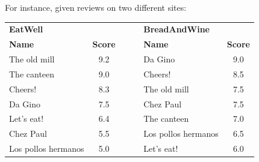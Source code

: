 \begin{example}
    For instance, given reviews on two different sites:
    \begin{table}[H]
        \centering
        \begin{tabular}{ccccc}
        \multicolumn{1}{l}{\textbf{EatWell}}     &                                     & $\:\:\:\:\:\:$                 & \multicolumn{1}{l}{\textbf{BreadAndWine}} &                                  \\ \cline{1-2} \cline{4-5} 
        \multicolumn{1}{|l}{\textbf{Name}}       & \multicolumn{1}{c|}{\textbf{Score}} & \multicolumn{1}{c|}{\textbf{}} & \multicolumn{1}{l}{\textbf{Name}}        & \multicolumn{1}{c|}{\textbf{Score}} \\ \cline{1-2} \cline{4-5} 
        \multicolumn{1}{|l}{The old mill}        & \multicolumn{1}{c|}{9.2}            & \multicolumn{1}{c|}{}          & \multicolumn{1}{l}{Da Gino}              & \multicolumn{1}{c|}{9.0}            \\
        \multicolumn{1}{|l}{The canteen}         & \multicolumn{1}{c|}{9.0}            & \multicolumn{1}{c|}{}          & \multicolumn{1}{l}{Cheers!}              & \multicolumn{1}{c|}{8.5}            \\  
        \multicolumn{1}{|l}{Cheers!}             & \multicolumn{1}{c|}{8.3}            & \multicolumn{1}{c|}{}          & \multicolumn{1}{l}{The old mill}         & \multicolumn{1}{c|}{7.5}            \\ 
        \multicolumn{1}{|l}{Da Gino}             & \multicolumn{1}{c|}{7.5}            & \multicolumn{1}{c|}{}          & \multicolumn{1}{l}{Chez Paul}            & \multicolumn{1}{c|}{7.5}            \\ 
        \multicolumn{1}{|l}{Let's eat!}          & \multicolumn{1}{c|}{6.4}            & \multicolumn{1}{c|}{}          & \multicolumn{1}{l}{The canteen}          & \multicolumn{1}{c|}{7.0}            \\ 
        \multicolumn{1}{|l}{Chez Paul}           & \multicolumn{1}{c|}{5.5}            & \multicolumn{1}{c|}{}          & \multicolumn{1}{l}{Los pollos hermanos}  & \multicolumn{1}{c|}{6.5}            \\ 
        \multicolumn{1}{|l}{Los pollos hermanos} & \multicolumn{1}{c|}{5.0}            & \multicolumn{1}{c|}{}          & \multicolumn{1}{l}{Let's eat!}           & \multicolumn{1}{c|}{6.0}            \\ \cline{1-2} \cline{4-5} 
        \end{tabular}

\end{table}
\end{example}
